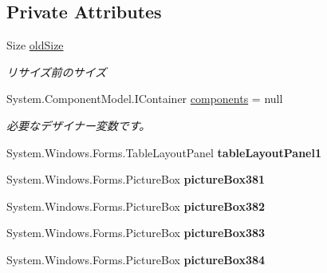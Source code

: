 \subsection*{Private Attributes}
\begin{DoxyCompactItemize}
\item 
\mbox{\label{class_reversi_form_1_1_reversi_a4cbca5b82cf5dd63835920c9bc9088b5}} 
Size \hyperlink{class_reversi_form_1_1_reversi_a4cbca5b82cf5dd63835920c9bc9088b5}{old\+Size}
\begin{DoxyCompactList}\small\item\em リサイズ前のサイズ \end{DoxyCompactList}\item 
System.\+Component\+Model.\+I\+Container \hyperlink{class_reversi_form_1_1_reversi_a2edc9ab9401997c20553b26aadef1ea0}{components} = null
\begin{DoxyCompactList}\small\item\em 必要なデザイナー変数です。 \end{DoxyCompactList}\item 
\mbox{\label{class_reversi_form_1_1_reversi_a9c1a91f97ee65445615b038aca1e72ad}} 
System.\+Windows.\+Forms.\+Table\+Layout\+Panel {\bfseries table\+Layout\+Panel1}
\item 
\mbox{\label{class_reversi_form_1_1_reversi_a245193a3e7d97b444dff75302e121d1f}} 
System.\+Windows.\+Forms.\+Picture\+Box {\bfseries picture\+Box381}
\item 
\mbox{\label{class_reversi_form_1_1_reversi_a83ea383942c37ff1e4c8511778944bfb}} 
System.\+Windows.\+Forms.\+Picture\+Box {\bfseries picture\+Box382}
\item 
\mbox{\label{class_reversi_form_1_1_reversi_ae002f4e7698ce16ade2b501bfdd94186}} 
System.\+Windows.\+Forms.\+Picture\+Box {\bfseries picture\+Box383}
\item 
\mbox{\label{class_reversi_form_1_1_reversi_a526f751740d210075b88b4e05e457c73}} 
System.\+Windows.\+Forms.\+Picture\+Box {\bfseries picture\+Box384}
\item 
\mbox{\label{class_reversi_form_1_1_reversi_ab4812a4de582baba528104b8c5bcc7cf}} 

\end{DoxyCompactItemize}
